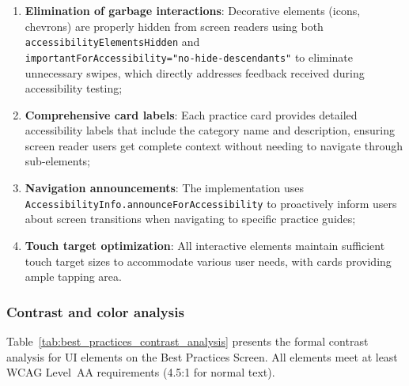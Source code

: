\begin{enumerate}
    \item \textbf{Elimination of garbage interactions}: Decorative elements (icons, chevrons) are properly hidden from screen readers using both \texttt{accessibilityElementsHidden} and \\ \texttt{importantForAccessibility="no-hide-descendants"} to eliminate unnecessary swipes, which directly addresses feedback received during accessibility testing;
    
    \item \textbf{Comprehensive card labels}: Each practice card provides detailed accessibility labels that include the category name and description, ensuring screen reader users get complete context without needing to navigate through sub-elements;
    
    \item \textbf{Navigation announcements}: The implementation uses \\ \texttt{AccessibilityInfo.announceForAccessibility} to proactively inform users about screen transitions when navigating to specific practice guides;
    
    \item \textbf{Touch target optimization}: All interactive elements maintain sufficient touch target sizes to accommodate various user needs, with cards providing ample tapping area.
\end{enumerate}

\subsubsection{Contrast and color analysis}

Table~\ref{tab:best_practices_contrast_analysis} presents the formal contrast analysis for UI elements on the Best Practices Screen. All elements meet at least WCAG Level~AA requirements (4.5:1 for normal text).

